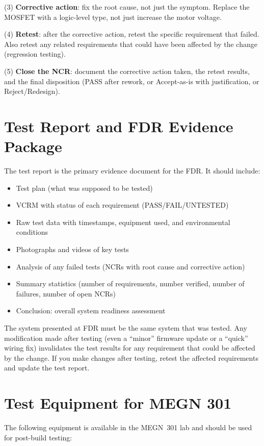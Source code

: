 (3) \textbf{Corrective action}: fix the root cause, not just the symptom. Replace the MOSFET with a logic-level type, not just increase the motor voltage.

(4) \textbf{Retest}: after the corrective action, retest the specific requirement that failed. Also retest any related requirements that could have been affected by the change (regression testing).

(5) \textbf{Close the NCR}: document the corrective action taken, the retest results, and the final disposition (PASS after rework, or Accept-as-is with justification, or Reject/Redesign).

\section{Test Report and FDR Evidence Package}
The test report is the primary evidence document for the FDR. It should include:

\begin{itemize}[nosep,leftmargin=1.5em]
\item Test plan (what was supposed to be tested)
\item VCRM with status of each requirement (PASS/FAIL/UNTESTED)
\item Raw test data with timestamps, equipment used, and environmental conditions
\item Photographs and videos of key tests
\item Analysis of any failed tests (NCRs with root cause and corrective action)
\item Summary statistics (number of requirements, number verified, number of failures, number of open NCRs)
\item Conclusion: overall system readiness assessment
\end{itemize}

\begin{warningbox}
The system presented at FDR must be the same system that was tested. Any modification made after testing (even a ``minor'' firmware update or a ``quick'' wiring fix) invalidates the test results for any requirement that could be affected by the change. If you make changes after testing, retest the affected requirements and update the test report.
\end{warningbox}

\section{Test Equipment for MEGN 301}
The following equipment is available in the MEGN~301 lab and should be used for post-build testing:


